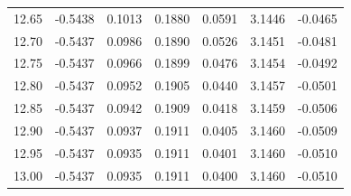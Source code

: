 \begin{longtable}{|c|c|c|c|c|c|c|}
12.65 & -0.5438 & 0.1013 & 0.1880 & 0.0591 & 3.1446 & -0.0465 \\
12.70 & -0.5437 & 0.0986 & 0.1890 & 0.0526 & 3.1451 & -0.0481 \\
12.75 & -0.5437 & 0.0966 & 0.1899 & 0.0476 & 3.1454 & -0.0492 \\
12.80 & -0.5437 & 0.0952 & 0.1905 & 0.0440 & 3.1457 & -0.0501 \\
12.85 & -0.5437 & 0.0942 & 0.1909 & 0.0418 & 3.1459 & -0.0506 \\
12.90 & -0.5437 & 0.0937 & 0.1911 & 0.0405 & 3.1460 & -0.0509 \\
12.95 & -0.5437 & 0.0935 & 0.1911 & 0.0401 & 3.1460 & -0.0510 \\
13.00 & -0.5437 & 0.0935 & 0.1911 & 0.0400 & 3.1460 & -0.0510 \\
\end{longtable}
